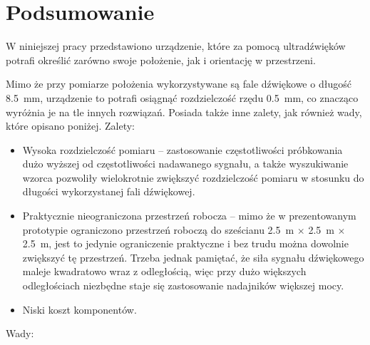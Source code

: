 \chapter{Podsumowanie}

W niniejszej pracy przedstawiono urządzenie, które za pomocą ultradźwięków  potrafi określić zarówno swoje
położenie, jak i orientację w przestrzeni.

Mimo że przy pomiarze położenia wykorzystywane są fale dźwiękowe o długość \SI{8,5}{mm}, urządzenie to
potrafi osiągnąć rozdzielczość  rzędu \SI{0,5}{mm}, co znacząco wyróżnia je na tle innych rozwiązań.
Posiada także inne zalety, jak również wady, które opisano poniżej.
\newline
Zalety:
\begin{itemize}
 \item Wysoka rozdzielczość pomiaru -- zastosowanie częstotliwości 
 próbkowania dużo wyższej od częstotliwości nadawanego sygnału, a także wyszukiwanie wzorca pozwoliły
 wielokrotnie zwiększyć rozdzielczość pomiaru w stosunku do długości wykorzystanej fali dźwiękowej.
 
 \item Praktycznie nieograniczona przestrzeń robocza -- mimo że w prezentowanym prototypie
 ograniczono przestrzeń roboczą do sześcianu \SI{2,5}{m} $\times$ \SI{2,5}{m} $\times$ \SI{2,5}{m},
 jest to jedynie ograniczenie praktyczne i bez trudu można dowolnie zwiększyć tę przestrzeń. Trzeba jednak 
 pamiętać, że siła sygnału dźwiękowego maleje kwadratowo wraz z odległością, więc przy dużo większych odległościach
 niezbędne staje się zastosowanie nadajników większej mocy. 
 
 \item Niski koszt komponentów.
\end{itemize}
Wady:
